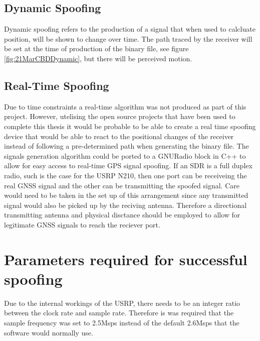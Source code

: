 \subsection{Dynamic Spoofing}
Dynamic spoofing refers to the production of a signal that when used to calcluate position, will be shown to change over time. The path traced by the receiver will be
set at the time of production of the binary file, see figure \ref{fig:21MarCBDDynamic}, but there will be perceived motion.

\subsection{Real-Time Spoofing}
Due to time constraints a real-time algorithm was not produced as part of this project. However, utelising the open source projects that have been used to complete this
thesis it would be probable to be able to create a real time spoofing device that would be able to react to the positional changes of the receiver instead of following a
pre-determined path when generating the binary file. The signals generation algorithm could be ported to a GNURadio block in C++ to allow for easy access to real-time GPS
signal spoofing. If an SDR is a full duplex radio, such is the case for the USRP N210, then one port can be receiveing the real GNSS signal and the other can be
transmitting the spoofed signal. Care would need to be taken in the set up of this arrangement since any transmitted signal would also be picked up by the reciving
antenna. Therefore a directional transmitting antenna and physical disctance should be employed to allow for legitimate GNSS signals to reach the reciever port. 

\section{Parameters required for successful spoofing}
Due to the internal workings of the USRP, there needs to be an integer ratio between the clock rate and sample rate. Therefore is was required that the sample frequency
was set to 2.5Msps instead of the default 2.6Msps that the software would normally use.

